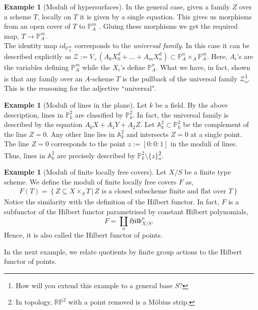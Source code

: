 \documentclass[11pt]{amsart}
\newcommand{\sO}{{\mathcal O}}
\newcommand{\sZ}{{\mathcal Z}}
\newcommand{\A}{{\mathbb A}}
\renewcommand{\P}{{\mathbb P}}
\newcommand{\R}{{\mathbb R}}
\theoremstyle{definition}
\newtheorem{example}[theorem]{Example}
\begin{document}
\begin{example}[Moduli of hypersurfaces]
	In the general case, given a family $Z$ over a scheme $T$, locally on $T$ it is given by a single equation. This gives us morphisms from an open cover of $T$ to $\P^m_A$ . Gluing these morphisms we get the required map, $T\rightarrow \P^m_A$. \\
	The identity map $id_{\P^m_A}$ corresponds to the \textit{universal family}. In this case it can be described explicitly as $\sZ:=V_+(A_0 X_0^d+\ldots + A_m X_n^d)\subset \P^n_A\times_A \P^m_A$. Here, $A_i$'s are the variables defining $\P^m_A$ while the $X_i$'s define $\P^n_A$. What we have, in fact, shown is that any family over an $A$-scheme $T$ is the pullback of the universal family $\sZ$\footnote{How will you extend this example to a general base $S$?}. This is the reasoning for the adjective ``universal".
\end{example}

\begin{example}[Moduli of lines in the plane]
	Let $k$ be a field. By the above description, lines in $\P_k^2$ are classified by $\P_k^2$. In fact, the universal family is described by the equation $A_0 X+A_1 Y + A_2 Z$. Let $\A_k^2\subset \P_k^2$ be the complement of the line $Z=0$. Any other line lies in $\A_k^2$ and intersects $Z=0$ at a single point. The line $Z=0$ corresponds to the point $z:=[0:0:1]$ in the moduli of lines. Thus, lines in $\A^2_k$ are precisely described by $\P^2_k \setminus \{z\}$\footnote{In topology, $\R\P^2$ with a point removed is a M\"{o}bius strip.}.
\end{example}
\begin{example}[Moduli of finite locally free covers] 
	Let $X/S$ be a finite type scheme. We define the moduli of finite locally free covers $F$ as,
	\begin{align*}
	F(T)= \left\{
	Z \subseteq X\times_S T \,
	\left|\,\text{$Z$ is a closed subscheme finite and flat over $T$}\right.
	\right\}
	\end{align*}
	Notice the similarity with the definition of the Hilbert functor. In fact, $F$ is a subfunctor of the Hilbert functor parametrised by constant Hilbert polynomials,
	\[F=\underset{n}{\coprod}\mathfrak{Hilb}^n_{X/S}.\]
	Hence, it is also called the Hilbert functor of points.
\end{example}

In the next example, we relate quotients by finite group actions to the Hilbert functor of points.
\end{document}
